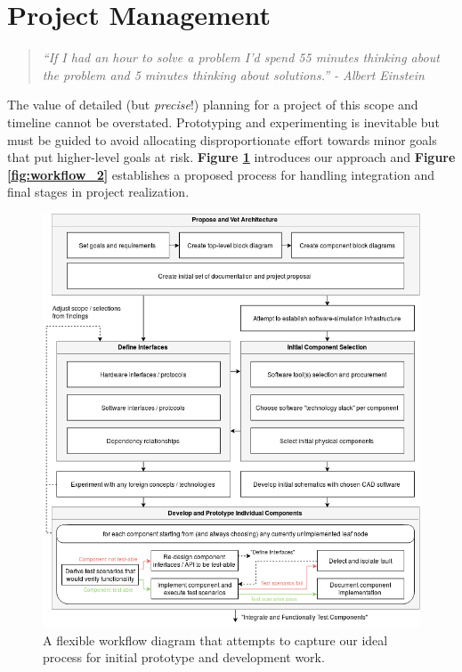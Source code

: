 \documentclass{article}
\begin{document}
\section{Project Management}

\begin{quote}
	\textit{``If I had an hour to solve a problem I'd spend 55 minutes
	thinking about the problem and 5 minutes thinking about
	solutions.'' - Albert Einstein}
\end{quote}

\noindent The value of detailed (but \textit{precise}!) planning for a project
of this scope and timeline cannot be overstated. Prototyping and experimenting
is inevitable but must be guided to avoid allocating disproportionate effort
towards minor goals that put higher-level goals at risk.
\textbf{Figure \ref{fig:workflow_1}} introduces our approach and
\textbf{Figure \ref{fig:workflow_2}} establishes a proposed process for
handling integration and final stages in project realization.

\begin{figure}[H]
	\centering
	\includegraphics[width=\linewidth]{../src/im/workflow_1}
	\caption{A flexible workflow diagram that attempts to capture our ideal
		process for initial prototype and development work.}
	\label{fig:workflow_1}
\end{figure}
\end{document}
